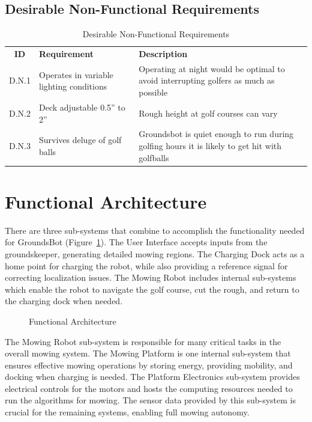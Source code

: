 \documentclass{article}
\begin{document}
\subsection{Desirable Non-Functional Requirements}
\begin{center}
  \begin{table}
  	\caption{Desirable Non-Functional Requirements}
  	\label{table: desirable non-functional}
  	\def\arraystretch{1.5}
	\begin{tabularx}{\textwidth}{ cXX }
  	  \textbf{ID} & \textbf{Requirement} &
  	  \textbf{Description} \\
  	  D.N.1 &
  	  Operates in variable lighting conditions &
  	  Operating at night would be optimal to avoid interrupting golfers as much as possible\\
  	  D.N.2 &
  	  Deck adjustable 0.5” to 2” &
  	  Rough height at golf courses can vary\\
  	  D.N.3 &
  	  Survives deluge of golf balls &
  	  Groundsbot is quiet enough to run during golfing hours it is likely to get hit with golfballs\\
	\end{tabularx}
  \end{table}
\end{center}


\section{Functional Architecture}
  There are three sub-systems that combine to accomplish the functionality needed for GroundsBot (Figure~\ref{fig:functional}). The User Interface accepts inputs from the groundskeeper, generating detailed mowing regions. The Charging Dock acts as a home point for charging the robot, while also providing a reference signal for correcting localization issues. The Mowing Robot includes internal sub-systems which enable the robot to navigate the golf course, cut the rough, and return to the charging dock when needed.\\
  
\begin{figure}[H]
\centering
\def\svgwidth{\columnwidth}

\caption{Functional Architecture}
\label{fig:functional}
\end{figure}

  The Mowing Robot sub-system is responsible for many critical tasks in the overall mowing system. The Mowing Platform is one internal sub-system that ensures effective mowing operations by storing energy, providing mobility, and docking when charging is needed. The Platform Electronics sub-system provides electrical controls for the motors and hosts the computing resources needed to run the algorithms for mowing. The sensor data provided by this sub-system is crucial for the remaining systems, enabling full mowing autonomy.\\
  
\end{document}
